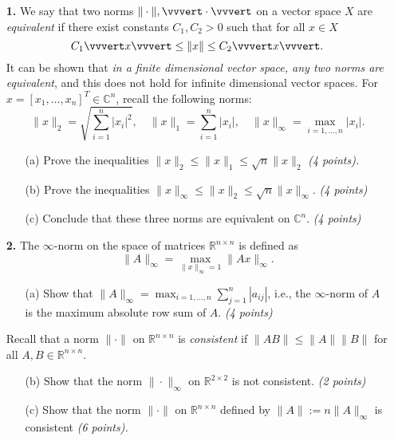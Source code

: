 \documentclass[10pt]{report}
\begin{document}
\begin{enumerate}
\item[\textbf{1.}] 
We say that two norms $\| \cdot \|, \vvvert \cdot \vvvert$ on a vector space $X$ are \textit{equivalent} if there exist constants $C_1, C_2 > 0$ such that for all $x \in X$
\[C_1 \vvvert x \vvvert \leq \|x\| \leq  C_2\vvvert x\vvvert.\]
It can be shown that \textit{in a finite dimensional vector space, any two norms are equivalent}, and this does not hold for infinite dimensional vector spaces. For $x =[x_1, \ldots, x_n]^T \in \mathbb{C}^{n}$, recall the following norms: 
\[
\|x\|_2 =\sqrt{\sum_{i=1}^n |x_i|^2},\quad
\|x\|_1 = \sum_{i=1}^n |x_i|,\quad
\|x\|_{\infty} = \max_{i=1, \ldots,n}|x_i|.
\]
\begin{enumerate}
  \item[(a)] Prove the inequalities $\|x\|_2 \leq \|x\|_1 \leq \sqrt{n}\|x\|_2$ \textit{(4 points).}
  \item[(b)]Prove the inequalities $ \|x\|_\infty \leq \|x\|_2 \leq  \sqrt{n}\|x\|_{\infty}$. \textit{(4 points)}
\item[(c)] Conclude that these three norms are equivalent on $\mathbb{C}^n$. \textit{(4 points)}
\end{enumerate}
\vspace{0.1cm} 


\item[\textbf{2.}] The $\infty$-norm on the space of matrices $\mathbb{R}^{n \times n}$ is defined as
\[\|A\|_{\infty}= \max_{\|x\|_{\infty}=1} \|Ax\|_{\infty}.\]
\begin{enumerate} 
\item[(a)] Show that $\|A\|_{\infty}= \displaystyle{\max_{i=1, \ldots, n}}\sum_{j=1}^n |a_{ij}|$, i.e., the $\infty$-norm of $A$ is the maximum absolute row sum of $A$. \textit{(4 points)} 
\end{enumerate}
Recall that a norm $\|\cdot\|$ on $\mathbb{R}^{n \times n}$ is \textit{consistent} if $\|AB\| \leq \|A\| \|B\|$ for all $A, B \in \mathbb{R}^{n \times n}$. 
\begin{enumerate} 
\item[(b)]Show that the norm $\|\cdot\|_\infty$ on $\mathbb{R}^{2 \times 2}$ is not consistent. \textit{(2 points)} 
\item[(c)] Show that the norm $\| \cdot\|$ on $\mathbb{R}^{n \times n}$ defined by $\|A\|:=n \|A\|_\infty$ is consistent \textit{(6 points).}
\end{enumerate} 
\vspace{0.1cm} 



\end{enumerate}
\end{document}
